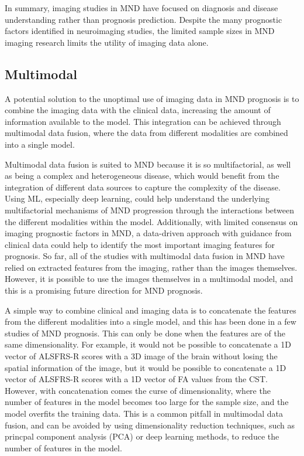 In summary, imaging studies in MND have focused on diagnosis and disease understanding rather than prognosis prediction.
Despite the many prognostic factors identified in neuroimaging studies, the limited sample sizes in MND imaging research limits the utility of imaging data alone.

\subsection{Multimodal}

A potential solution to the unoptimal use of imaging data in MND prognosis is to combine the imaging data with the clinical data, increasing the amount of information available to the model.
This integration can be achieved through multimodal data fusion, where the data from different modalities are combined into a single model.

Multimodal data fusion is suited to MND because it is so multifactorial, as well as being a complex and heterogeneous disease, which would benefit from the integration of different data sources to capture the complexity of the disease.
Using ML, especially deep learning, could help understand the underlying multifactorial mechanisms of MND progression through the interactions between the different modalities within the model.
Additionally, with limited consensus on imaging prognostic factors in MND, a data-driven approach with guidance from clinical data could help to identify the most important imaging features for prognosis.
So far, all of the studies with multimodal data fusion in MND have relied on extracted features from the imaging, rather than the images themselves.
However, it is possible to use the images themselves in a multimodal model, and this is a promising future direction for MND prognosis.

A simple way to combine clinical and imaging data is to concatenate the features from the different modalities into a single model, and this has been done in a few studies of MND prognosis.
This can only be done when the features are of the same dimensionality.
For example, it would not be possible to concatenate a 1D vector of ALSFRS-R scores with a 3D image of the brain without losing the spatial information of the image, but it would be possible to concatenate a 1D vector of ALSFRS-R scores with a 1D vector of FA values from the CST.
However, with concatenation comes the curse of dimensionality, where the number of features in the model becomes too large for the sample size, and the model overfits the training data.
This is a common pitfall in multimodal data fusion, and can be avoided by using dimensionality reduction techniques, such as princpal component analysis (PCA) or deep learning methods, to reduce the number of features in the model.

